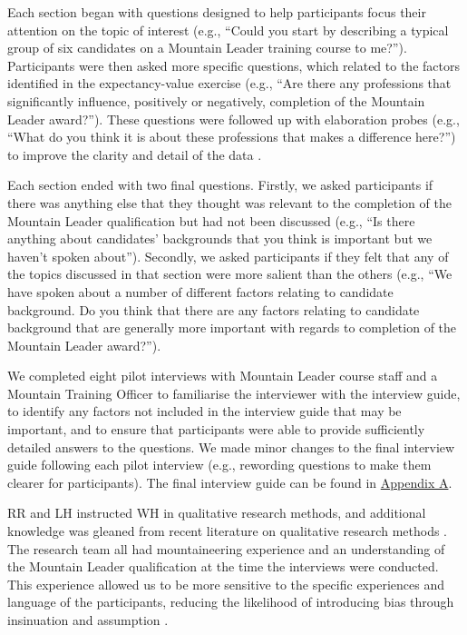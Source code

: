 \documentclass[
  12pt,
  a4paper,
]{book}
\begin{document}
Each section began with questions designed to help participants focus their attention on the topic of interest (e.g., ``Could you start by describing a typical group of six candidates on a Mountain Leader training course to me?''). Participants were then asked more specific questions, which related to the factors identified in the expectancy-value exercise (e.g., ``Are there any professions that significantly influence, positively or negatively, completion of the Mountain Leader award?''). These questions were followed up with elaboration probes (e.g., ``What do you think it is about these professions that makes a difference here?'') to improve the clarity and detail of the data \citep{Patton2002}.

Each section ended with two final questions. Firstly, we asked participants if there was anything else that they thought was relevant to the completion of the Mountain Leader qualification but had not been discussed (e.g., ``Is there anything about candidates' backgrounds that you think is important but we haven't spoken about''). Secondly, we asked participants if they felt that any of the topics discussed in that section were more salient than the others (e.g., ``We have spoken about a number of different factors relating to candidate background. Do you think that there are any factors relating to candidate background that are generally more important with regards to completion of the Mountain Leader award?'').

We completed eight pilot interviews with Mountain Leader course staff and a Mountain Training Officer to familiarise the interviewer with the interview guide, to identify any factors not included in the interview guide that may be important, and to ensure that participants were able to provide sufficiently detailed answers to the questions. We made minor changes to the final interview guide following each pilot interview (e.g., rewording questions to make them clearer for participants). The final interview guide can be found in \protect\hyperlink{appendix-interview-guide}{Appendix A}.

RR and LH instructed WH in qualitative research methods, and additional knowledge was gleaned from recent literature on qualitative research methods \citep[e.g.,][]{Smith2018a}. The research team all had mountaineering experience and an understanding of the Mountain Leader qualification at the time the interviews were conducted. This experience allowed us to be more sensitive to the specific experiences and language of the participants, reducing the likelihood of introducing bias through insinuation and assumption \citep{Denzin2005}.
\end{document}
